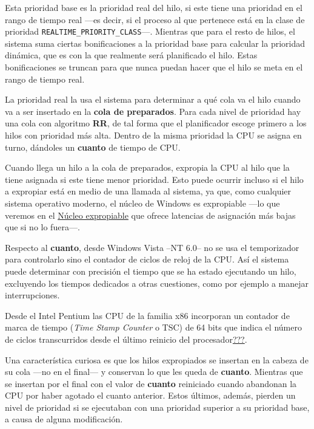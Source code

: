 Esta prioridad base es la prioridad real del hilo, si este tiene una
prioridad en el rango de tiempo real ---es decir, si el proceso al que
pertenece está en la clase de prioridad
\texttt{REALTIME\_PRIORITY\_CLASS}---. Mientras que para el resto de
hilos, el sistema suma ciertas bonificaciones a la prioridad base para
calcular la prioridad dinámica, que es con la que realmente será
planificado el hilo. Estas bonificaciones se truncan para que nunca
puedan hacer que el hilo se meta en el rango de tiempo real.

La prioridad real la usa el sistema para determinar a qué cola va el
hilo cuando va a ser insertado en la \textbf{cola de preparados}. Para
cada nivel de prioridad hay una cola con algoritmo \textbf{RR}, de tal
forma que el planificador escoge primero a los hilos con prioridad más
alta. Dentro de la misma prioridad la CPU se asigna en turno, dándoles
un \textbf{cuanto} de tiempo de CPU.

Cuando llega un hilo a la cola de preparados, expropia la CPU al hilo
que la tiene asignada si este tiene menor prioridad. Esto puede ocurrir
incluso si el hilo a expropiar está en medio de una llamada al sistema,
ya que, como cualquier sistema operativo moderno, el núcleo de Windows
es expropiable ---lo que veremos en el
\hyperref[_nuxfacleo_expropiable]{Núcleo expropiable} que ofrece
latencias de asignación más bajas que si no lo fuera---.

Respecto al \textbf{cuanto}, desde Windows Vista --NT 6.0-- no se usa el
temporizador para controlarlo sino el contador de ciclos de reloj de la
CPU. Así el sistema puede determinar con precisión el tiempo que se ha
estado ejecutando un hilo, excluyendo los tiempos dedicados a otras
cuestiones, como por ejemplo a manejar interrupciones.

Desde el Intel Pentium las CPU de la familia x86 incorporan un contador
de marca de tiempo (\emph{Time Stamp Counter} o TSC) de 64 bits que
indica el número de ciclos transcurridos desde el último reinicio del
procesador\hyperref[Wikipedia-TSC]{???}.

Una característica curiosa es que los hilos expropiados se insertan en
la cabeza de su cola ---no en el final--- y conservan lo que les queda
de \textbf{cuanto}. Mientras que se insertan por el final con el valor
de \textbf{cuanto} reiniciado cuando abandonan la CPU por haber agotado
el cuanto anterior. Estos últimos, además, pierden un nivel de prioridad
si se ejecutaban con una prioridad superior a su prioridad base, a causa
de alguna modificación.

